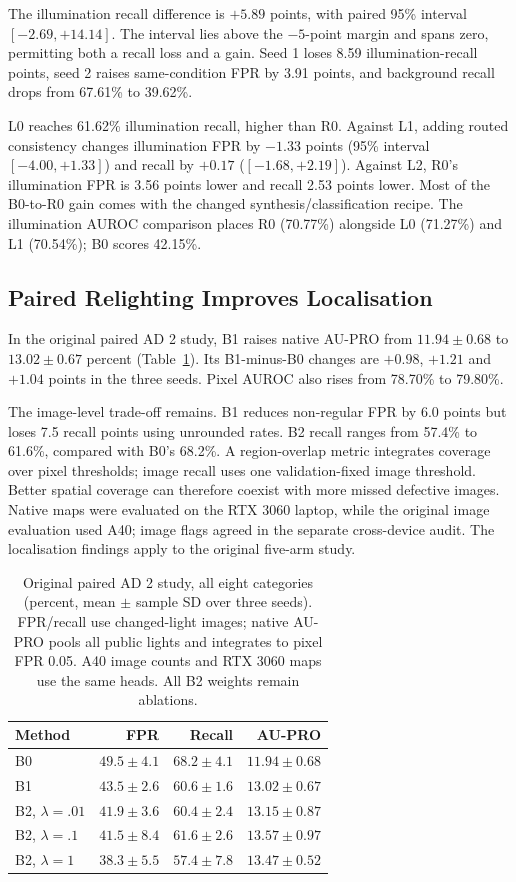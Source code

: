 \documentclass[letterpaper]{article}
\begin{document}
The illumination recall difference is $+5.89$ points, with paired 95\% interval
$[-2.69,+14.14]$. The interval lies above the $-5$-point margin and spans zero, permitting
both a recall loss and a gain. Seed 1 loses 8.59 illumination-recall points, seed 2 raises
same-condition FPR by 3.91 points, and background recall drops from 67.61\% to 39.62\%.

L0 reaches 61.62\% illumination recall, higher than R0. Against L1, adding routed
consistency changes illumination FPR by $-1.33$ points (95\% interval $[-4.00,+1.33]$) and
recall by $+0.17$ ($[-1.68,+2.19]$). Against L2, R0's illumination FPR is 3.56 points lower
and recall 2.53 points lower. Most of the B0-to-R0 gain comes with the changed
synthesis/classification recipe. The illumination AUROC comparison places R0 (70.77\%)
alongside L0 (71.27\%) and L1 (70.54\%); B0 scores 42.15\%.

\subsection{Paired Relighting Improves Localisation}

In the original paired AD 2 study, B1 raises native AU-PRO from $11.94\pm0.68$ to
$13.02\pm0.67$ percent (Table~\ref{tab:paired}). Its B1-minus-B0 changes are $+0.98$,
$+1.21$ and $+1.04$ points in the three seeds. Pixel AUROC also rises from 78.70\% to
79.80\%.

The image-level trade-off remains. B1 reduces non-regular FPR by 6.0 points but loses 7.5
recall points using unrounded rates. B2 recall ranges from 57.4\% to 61.6\%, compared with
B0's 68.2\%. A region-overlap metric integrates coverage over pixel thresholds; image recall
uses one validation-fixed image threshold. Better spatial coverage can therefore coexist
with more missed defective images. Native maps were evaluated on the RTX 3060 laptop, while
the original image evaluation used A40; image flags agreed in the separate cross-device
audit. The localisation findings apply to the original five-arm study.

\begin{table}[t]
\centering\small
\begin{tabular}{lrrr}
\toprule
Method & FPR & Recall & AU-PRO\\
\midrule
B0 & $49.5\pm4.1$ & $68.2\pm4.1$ & $11.94\pm0.68$\\
B1 & $43.5\pm2.6$ & $60.6\pm1.6$ & $13.02\pm0.67$\\
B2, $\lambda=.01$ & $41.9\pm3.6$ & $60.4\pm2.4$ & $13.15\pm0.87$\\
B2, $\lambda=.1$ & $41.5\pm8.4$ & $61.6\pm2.6$ & $13.57\pm0.97$\\
B2, $\lambda=1$ & $38.3\pm5.5$ & $57.4\pm7.8$ & $13.47\pm0.52$\\
\bottomrule
\end{tabular}
\caption{Original paired AD 2 study, all eight categories (percent, mean $\pm$ sample SD over three seeds). FPR/recall use changed-light images; native AU-PRO pools all public lights and integrates to pixel FPR 0.05. A40 image counts and RTX 3060 maps use the same heads. All B2 weights remain ablations.}
\label{tab:paired}
\end{table}
\end{document}
